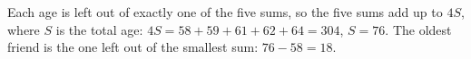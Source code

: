Each age is left out of exactly one of the five sums, so the five sums add up to $4S$, where $S$ is the total age: $4S=58+59+61+62+64=304$, $S=76$. The oldest friend is the one left out of the smallest sum: $76-58=\boxed{18}$.
